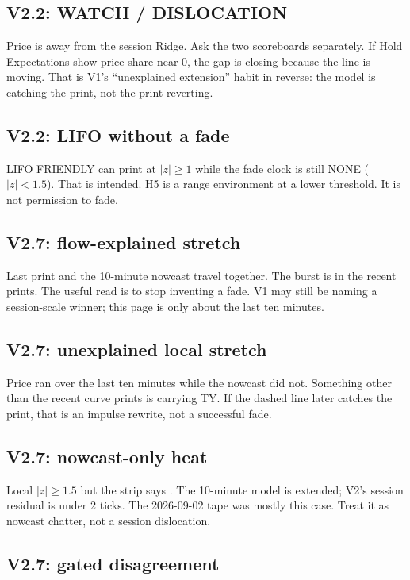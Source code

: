 \documentclass[11pt]{article}
\newcommand{\code}[1]{\texttt{\detokenize{#1}}}
\newcommand{\abs}[1]{\lvert #1 \rvert}
\begin{document}
\subsection{V2.2: WATCH / DISLOCATION}

Price is away from the session Ridge.  Ask the two scoreboards
separately.  If Hold Expectations show price share near 0, the
gap is closing because the line is moving.  That is V1's
``unexplained extension'' habit in reverse: the model is catching
the print, not the print reverting.

\subsection{V2.2: LIFO without a fade}

LIFO FRIENDLY can print at \(\abs{z}\ge 1\) while the fade clock
is still NONE (\(\abs{z}<1.5\)).  That is intended.  H5 is a range
environment at a lower threshold.  It is not permission to fade.

\subsection{V2.7: flow-explained stretch}

Last print and the 10-minute nowcast travel together.  The burst
is in the recent prints.  The useful read is to stop inventing a
fade.  V1 may still be naming a session-scale winner; this page
is only about the last ten minutes.

\subsection{V2.7: unexplained local stretch}

Price ran over the last ten minutes while the nowcast did not.
Something other than the recent curve prints is carrying TY.  If
the dashed line later catches the print, that is an impulse
rewrite, not a successful fade.

\subsection{V2.7: nowcast-only heat}

Local \(\abs{z}\ge 1.5\) but the strip says \code{SKIP NOWCAST_ONLY}.
The 10-minute model is extended; V2's session residual is under 2
ticks.  The 2026-09-02 tape was mostly this case.  Treat it as
nowcast chatter, not a session dislocation.

\subsection{V2.7: gated disagreement}
\end{document}

